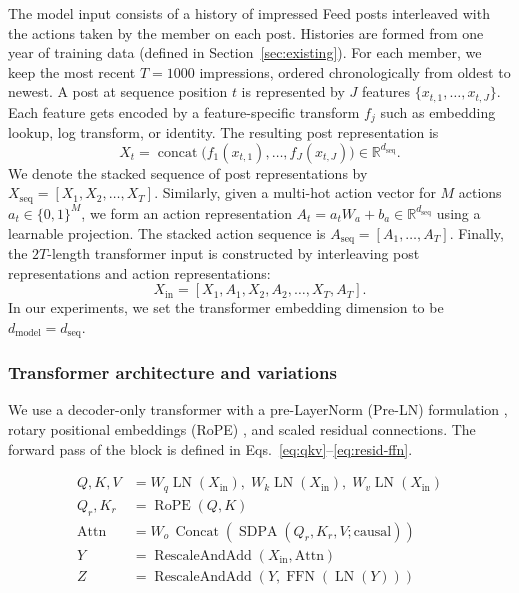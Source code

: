 \documentclass[sigconf]{acmart}
\begin{document}
The model input consists of a history of impressed Feed posts interleaved with the actions taken by the member on each post. Histories are formed from one year of training data (defined in Section~\ref{sec:existing}). For each member, we keep the most recent $T{=}1000$ impressions, ordered chronologically from oldest to newest. A post at sequence position $t$ is represented by $J$ features $\{x_{t,1}, \dots, x_{t,J}\}$. Each feature gets encoded by a feature-specific transform $f_j$ such as embedding lookup, log transform, or identity. The resulting post representation is
\begin{equation}
X_t = \operatorname{concat}\bigl(f_1(x_{t,1}), \dots, f_J(x_{t,J})\bigr)
\in \mathbb{R}^{d_{\text{seq}}}.
\label{eq:xt-concat}
\end{equation}
We denote the stacked sequence of post representations by $X_{\text{seq}} = [X_1, X_2, \ldots, X_T]$. Similarly, given a multi-hot action vector for $M$ actions $a_t \in \{0, 1\}^{M}$, we form an action representation $A_t = a_t W_a + b_a\in \mathbb{R}^{d_{\text{seq}}}$ using a learnable projection. The stacked action sequence is $A_{\text{seq}} = [A_1, \ldots, A_T]$. Finally, the $2T$-length transformer input is constructed by interleaving post representations and action representations:
\begin{equation}
X_{\text{in}} = [ X_1, A_1, X_2, A_2, \ldots, X_T, A_T ].
\label{eq:xin}
\end{equation}
In our experiments, we set the transformer embedding dimension to be $d_{\text{model}} = d_{\text{seq}}$.

\subsubsection{Transformer architecture and variations}\label{sec:transformer-arch}
We use a decoder-only transformer with a pre-LayerNorm (Pre-LN) formulation \cite{xiong2020layer}, rotary positional embeddings (RoPE) \cite{su2024roformer}, and scaled residual connections. The forward pass of the block is defined in Eqs.~\eqref{eq:qkv}--\eqref{eq:resid-ffn}.

\begin{align}
Q,K,V &= W_q\operatorname{LN}(X_{\text{in}}),\; W_k\operatorname{LN}(X_{\text{in}}),\; W_v\operatorname{LN}(X_{\text{in}}) \label{eq:qkv}\\
Q_r,K_r &= \operatorname{RoPE}(Q,K) \label{eq:rope}\\
\mathrm{Attn} &= W_o\,\operatorname{Concat}\!\left(\operatorname{SDPA}(Q_r,K_r,V;\text{causal})\right) \label{eq:attn}\\
Y &= \operatorname{RescaleAndAdd}(X_{\text{in}},\mathrm{Attn}) \label{eq:resid-attn}\\
Z &= \operatorname{RescaleAndAdd}\!\left(Y,\operatorname{FFN}(\operatorname{LN}(Y))\right) \label{eq:resid-ffn}
\end{align}
\end{document}
